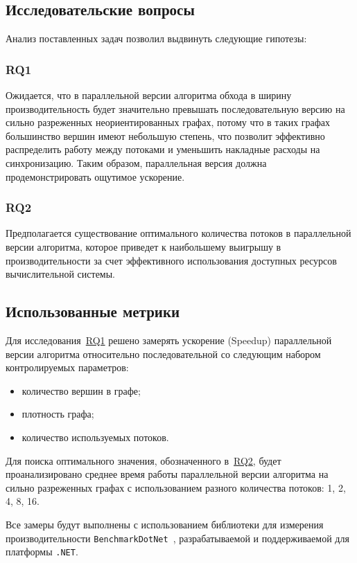 \subsection{Исследовательские вопросы}
Анализ поставленных задач позволил выдвинуть следующие гипотезы:
{\parindent0pt
    
    \subsubsection*{RQ1}
    \label{RQ1}
    Ожидается, что в параллельной версии алгоритма обхода в ширину производительность будет значительно превышать последовательную версию на сильно разреженных неориентированных графах, потому что в таких графах большинство вершин имеют небольшую степень, что позволит эффективно распределить работу между потоками и уменьшить накладные расходы на синхронизацию. Таким образом, параллельная версия должна продемонстрировать ощутимое ускорение.
}
{\parindent0pt
    \subsubsection*{RQ2}
    \label{RQ2}
    Предполагается существование оптимального количества потоков в параллельной версии алгоритма, которое приведет к наибольшему выигрышу в производительности за счет эффективного использования доступных ресурсов вычислительной системы.
}

\subsection{Использованные метрики}

Для исследования~\hyperref[RQ1]{RQ1} решено замерять ускорение (Speedup) параллельной версии алгоритма относительно последовательной со следующим набором контролируемых параметров:
\begin{itemize}
    \item количество вершин в графе;
    \item плотность графа;
    \item количество используемых потоков.
\end{itemize}

Для поиска оптимального значения, обозначенного в~\hyperref[RQ2]{RQ2}, будет проанализировано среднее время работы параллельной версии алгоритма на сильно разреженных графах с использованием разного количества потоков: 1, 2, 4, 8, 16.

Все замеры будут выполнены с использованием библиотеки для измерения производительности \texttt{BenchmarkDotNet}~\cite{benchTool}, разрабатываемой и поддерживаемой для платформы \texttt{.NET}.

